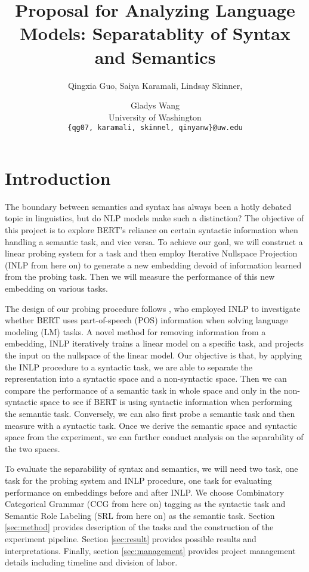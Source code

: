 \documentclass[11pt,a4paper]{article}
\title{Proposal for Analyzing Language Models: Separatablity of Syntax and Semantics}
\author{Qingxia Guo, Saiya Karamali, Lindsay Skinner, \and Gladys Wang
 \\ University of Washington \\ 
\texttt{\{qg07, karamali, skinnel, qinyanw\}@uw.edu}\\ 
}
\date{}
\begin{document}
\maketitle

\section{Introduction}

The boundary between semantics and syntax has always been a hotly debated topic in linguistics, but do NLP models make such a distinction? The objective of this project is to explore BERT\rq s \citep{bert} reliance on certain syntactic information when handling a semantic task, and vice versa. To achieve our goal, we will construct a linear probing system for a task and then employ Iterative Nullspace Projection (INLP from here on) \citep{inlp} to generate a new embedding devoid of information learned from the probing task. Then we will measure the performance of this new embedding on various tasks.

The design of our probing procedure follows \citealp{amnesia}, who employed INLP to investigate whether BERT uses part-of-speech (POS) information when solving language modeling (LM) tasks. A novel method for removing information from a embedding, INLP iteratively trains a linear model on a specific task, and projects the input on the nullspace of the linear model. Our objective is that, by applying the INLP procedure to a syntactic task, we are able to separate the representation into a syntactic space and a non-syntactic space. Then we can compare the performance of a semantic task in whole space and only in the non-syntactic space to see if BERT is using syntactic information when performing the semantic task. Conversely, we can also first probe a semantic task and then measure with a syntactic task. Once we derive the semantic space and syntactic space from the experiment, we can further conduct analysis on the separability of the two spaces. 

To evaluate the separability of syntax and semantics, we will need two task, one task for the probing system and INLP procedure, one task for evaluating performance on embeddings before and after INLP. We choose Combinatory Categorical Grammar (CCG from here on) tagging \citep{ccg-bank} as the syntactic task and Semantic Role Labeling (SRL from here on) \citep{propbank} as the semantic task. Section \ref{sec:method} provides description of the tasks and the construction of the experiment pipeline. Section \ref{sec:result} provides possible results and interpretations. Finally, section \ref{sec:management} provides project management details including timeline and division of labor.
\end{document}
